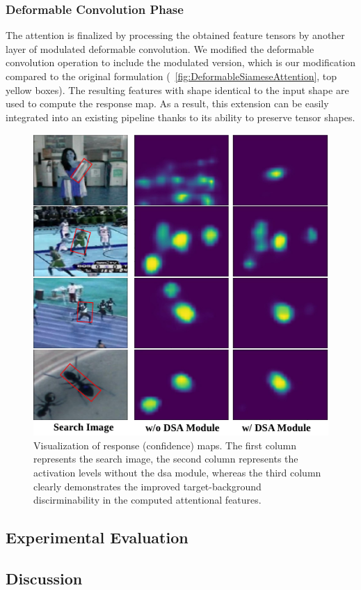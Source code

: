 \subsubsection{Deformable Convolution Phase}

The attention is finalized by processing the obtained feature tensors by another layer of modulated deformable convolution. We modified the deformable convolution operation to include the modulated version, which is our modification compared to the original formulation (\figtext{}~\ref{fig:DeformableSiameseAttention}, top yellow boxes). The resulting features with shape identical to the input shape are used to compute the response map. As a result, this extension can be easily integrated into an existing pipeline thanks to its ability to preserve tensor shapes.

\begin{figure}[t]
    \centerline{\includegraphics[width=0.5\linewidth]{figures/siamese_tracking/dsa_attention_visualization.pdf}}
    \caption[\Gls{dsa} attention visualization]{Visualization of response (confidence) maps. The first column represents the search image, the second column represents the activation levels without the \gls{dsa} module, whereas the third column clearly demonstrates the improved target-background discirminability in the computed attentional features. }
    \label{fig:DSAAttentionVisualization}
\end{figure}

\subsection{Experimental Evaluation}
\label{ssec:DSAExperimentalEvaluation}


\subsection{Discussion}
\label{ssec:DSADiscussion}

